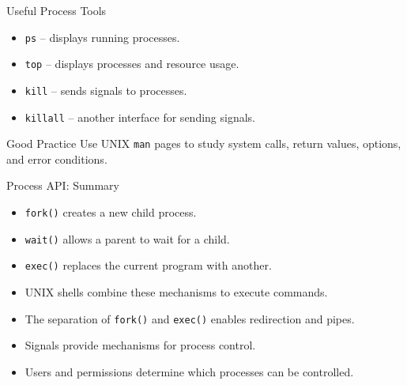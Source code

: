 \begin{frame}{Useful Process Tools}

\begin{itemize}
    \item \texttt{ps} -- displays running processes.
    \item \texttt{top} -- displays processes and resource usage.
    \item \texttt{kill} -- sends signals to processes.
    \item \texttt{killall} -- another interface for sending signals.
\end{itemize}

\vspace{0.3cm}

\begin{block}{Good Practice}
Use UNIX \texttt{man} pages to study system calls,
return values, options, and error conditions.
\end{block}

\end{frame}

\begin{frame}{Process API: Summary}

\begin{itemize}
    \item \texttt{fork()} creates a new child process.
    \item \texttt{wait()} allows a parent to wait for a child.
    \item \texttt{exec()} replaces the current program with another.
    \item UNIX shells combine these mechanisms to execute commands.
    \item The separation of \texttt{fork()} and \texttt{exec()}
          enables redirection and pipes.
    \item Signals provide mechanisms for process control.
    \item Users and permissions determine which processes can be controlled.
\end{itemize}

\end{frame}
